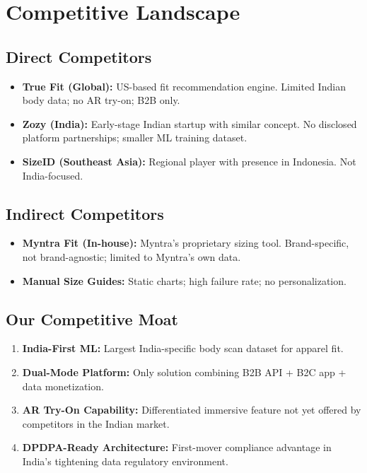 \documentclass[12pt,a4paper]{article}
\begin{document}
\section{Competitive Landscape}

\subsection{Direct Competitors}

\begin{itemize}
    \item \textbf{True Fit (Global):} US-based fit recommendation engine. Limited Indian body data; no AR try-on; B2B only.
    \item \textbf{Zozy (India):} Early-stage Indian startup with similar concept. No disclosed platform partnerships; smaller ML training dataset.
    \item \textbf{SizeID (Southeast Asia):} Regional player with presence in Indonesia. Not India-focused.
\end{itemize}

\subsection{Indirect Competitors}

\begin{itemize}
    \item \textbf{Myntra Fit (In-house):} Myntra's proprietary sizing tool. Brand-specific, not brand-agnostic; limited to Myntra's own data.
    \item \textbf{Manual Size Guides:} Static charts; high failure rate; no personalization.
\end{itemize}

\subsection{Our Competitive Moat}

\begin{enumerate}
    \item \textbf{India-First ML:} Largest India-specific body scan dataset for apparel fit.
    \item \textbf{Dual-Mode Platform:} Only solution combining B2B API + B2C app + data monetization.
    \item \textbf{AR Try-On Capability:} Differentiated immersive feature not yet offered by competitors in the Indian market.
    \item \textbf{DPDPA-Ready Architecture:} First-mover compliance advantage in India's tightening data regulatory environment.
\end{enumerate}
\end{document}
